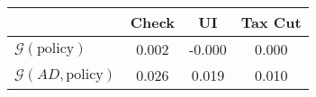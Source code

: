 \begin{tabular}{@{}lccc@{}}
\toprule
                          & Check      & UI    & Tax Cut    \\  \midrule
$\mathcal{G}(\text{policy})$ & 0.002  & -0.000  & 0.000     \\
$\mathcal{G}(AD,\text{policy})$ & 0.026  & 0.019  & 0.010     \\
\end{tabular}
